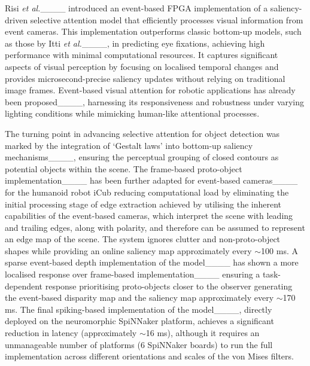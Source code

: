 Risi \emph{et al.}____ introduced an event-based FPGA implementation of a saliency-driven selective attention model that efficiently processes visual information from event cameras. This implementation outperforms classic bottom-up models, such as those by Itti \emph{et al.}____, in predicting eye fixations, achieving high performance with minimal computational resources. It captures significant aspects of visual perception by focusing on localised temporal changes and provides microsecond-precise saliency updates without relying on traditional image frames.
Event-based visual attention for robotic applications has already been proposed____, harnessing its responsiveness and robustness under varying lighting conditions while mimicking human-like attentional processes. 

The turning point in advancing selective attention for object detection was marked by the integration of `Gestalt laws' into bottom-up saliency mechanisms____, ensuring the perceptual grouping of closed contours as potential objects within the scene.
The frame-based proto-object implementation____ has been further adapted for event-based cameras____ for the humanoid robot iCub reducing computational load by eliminating the initial processing stage of edge extraction achieved by utilising the inherent capabilities of the event-based cameras, which interpret the scene with leading and trailing edges, along with polarity, and therefore can be assumed to represent an edge map of the scene. The system ignores clutter and non-proto-object shapes while providing an online saliency map approximately every $\sim$100 ms.
A sparse event-based depth implementation of the model____ has shown a more localised response over frame-based implementation____ ensuring a task-dependent response prioritising proto-objects closer to the observer generating the event-based disparity map and the saliency map approximately every $\sim$170 ms. The final spiking-based implementation of the model____, directly deployed on the neuromorphic SpiNNaker platform, achieves a significant reduction in latency (approximately $\sim$16 ms), although it requires an unmanageable number of platforms (6 SpiNNaker boards) to run the full implementation across different orientations and scales of the von Mises filters.

